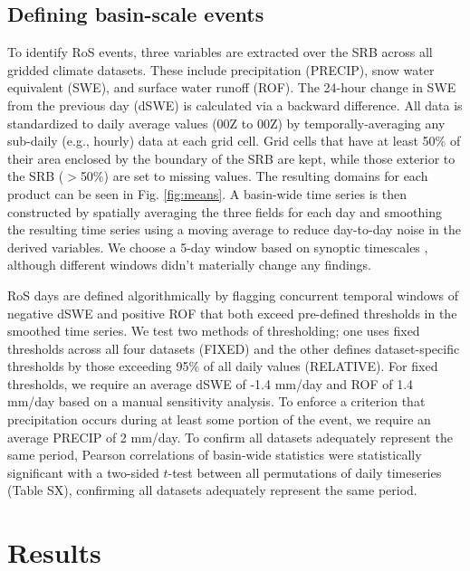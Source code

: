 \documentclass[draft]{agujournal2019}
\begin{document}
\subsection{Defining basin-scale events}

To identify RoS events, three variables are extracted over the SRB across all gridded climate datasets. 
These include precipitation (PRECIP), snow water equivalent (SWE), and surface water runoff (ROF). 
The 24-hour change in SWE from the previous day (dSWE) is calculated via a backward difference. 
All data is standardized to daily average values (00Z to 00Z) by temporally-averaging any sub-daily (e.g., hourly) data at each grid cell.
Grid cells that have at least 50\% of their area enclosed by the boundary of the SRB are kept, while those exterior to the SRB ($>$50\%) are set to missing values. 
The resulting domains for each product can be seen in Fig. \ref{fig:means}. A basin-wide time series is then constructed by spatially averaging the three fields for each day and smoothing the resulting time series using a moving average to reduce day-to-day noise in the derived variables. 
We choose a 5-day window based on synoptic timescales \citep{holton2004introduction}, although different windows didn't materially change any findings.

RoS days are defined algorithmically by flagging concurrent temporal windows of negative dSWE and positive ROF that both exceed pre-defined thresholds in the smoothed time series. 
We test two methods of thresholding; one uses fixed thresholds across all four datasets (FIXED) and the other defines dataset-specific thresholds by those exceeding 95\% of all daily values (RELATIVE). 
For fixed thresholds, we require an average dSWE of -1.4 mm/day and ROF of 1.4 mm/day based on a manual sensitivity analysis. To enforce a criterion that precipitation occurs during at least some portion of the event, we require an average PRECIP of 2 mm/day. 
To confirm all datasets adequately represent the same period, Pearson correlations of basin-wide statistics were statistically significant with a two-sided $t$-test between all permutations of daily timeseries (Table SX), confirming all datasets adequately represent the same period.


\section{Results}
\end{document}
